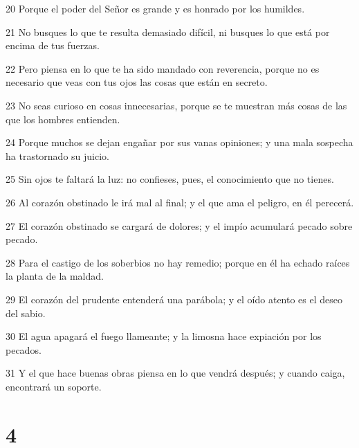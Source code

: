 \par 20 Porque el poder del Señor es grande y es honrado por los humildes.
\par 21 No busques lo que te resulta demasiado difícil, ni busques lo que está por encima de tus fuerzas.
\par 22 Pero piensa en lo que te ha sido mandado con reverencia, porque no es necesario que veas con tus ojos las cosas que están en secreto.
\par 23 No seas curioso en cosas innecesarias, porque se te muestran más cosas de las que los hombres entienden.
\par 24 Porque muchos se dejan engañar por sus vanas opiniones; y una mala sospecha ha trastornado su juicio.
\par 25 Sin ojos te faltará la luz: no confieses, pues, el conocimiento que no tienes.
\par 26 Al corazón obstinado le irá mal al final; y el que ama el peligro, en él perecerá.
\par 27 El corazón obstinado se cargará de dolores; y el impío acumulará pecado sobre pecado.
\par 28 Para el castigo de los soberbios no hay remedio; porque en él ha echado raíces la planta de la maldad.
\par 29 El corazón del prudente entenderá una parábola; y el oído atento es el deseo del sabio.
\par 30 El agua apagará el fuego llameante; y la limosna hace expiación por los pecados.
\par 31 Y el que hace buenas obras piensa en lo que vendrá después; y cuando caiga, encontrará un soporte.

\chapter{4}

